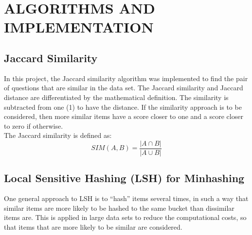 \documentclass[12pt]{article}
\begin{document}
	
	
	\section{ALGORITHMS AND IMPLEMENTATION}
	\subsection{Jaccard Similarity}
	In this project, the Jaccard similarity algorithm was implemented to find the pair of questions that are similar in the data set. The Jaccard similarity and Jaccard distance are differentiated by the mathematical definition. The similarity is subtracted from one (1) to have the distance. If the similarity approach is to be considered, then more similar items have a score closer to one and a score closer to zero if otherwise.
\\
	The Jaccard similarity is defined as:
		\begin{equation}
		\label{eq:emc}
		SIM(A, B) = \frac{|A \cap B|}{|A \cup B|}
		\end{equation}
	\subsection{Local Sensitive Hashing (LSH) for Minhashing}
	One general approach to LSH is to “hash” items several times, in such a way that similar items are more likely to be hashed to the same bucket than dissimilar items are. This is applied in large data sets to reduce the computational costs, so that items that are more likely to be similar are considered.
	
	
	
\end{document}
